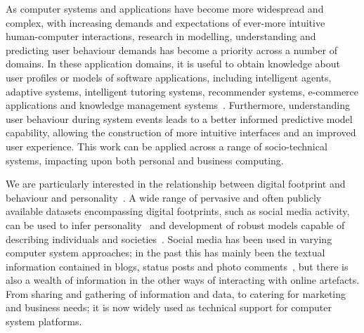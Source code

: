 \documentclass[graybox]{svmult}
\begin{document}
As computer systems and applications have become more widespread and
complex, with increasing demands and expectations of ever-more
intuitive human-computer interactions, research in modelling,
understanding and predicting user behaviour demands has become a
priority across a number of domains.  In these application domains, it
is useful to obtain knowledge about user profiles or models of
software applications, including intelligent agents, adaptive systems,
intelligent tutoring systems, recommender systems, e-commerce
applications and knowledge management
systems~\cite{schiaffino+amandi:2009}. Furthermore, understanding user
behaviour during system events leads to a better informed predictive
model capability, allowing the construction of more intuitive
interfaces and an improved user experience. This work can be applied
across a range of socio-technical systems, impacting upon both
personal and business computing.

We are particularly interested in the relationship between digital
footprint and behaviour and
personality~\cite{oatley+crick:2014,oatley-et-al_dasc2015}. A wide
range of pervasive and often publicly available datasets encompassing
digital footprints, such as social media activity, can be used to
infer
personality~\cite{lambiotte+kosinski:2014,oatley-et-al-soccogcomp2015}
and development of robust models capable of describing individuals and
societies~\cite{lazer-et-al:2009}. Social media has been used in
varying computer system approaches; in the past this has mainly been
the textual information contained in blogs, status posts and photo
comments~\cite{blamey-et-al-2012,blamey-et-al-2013}, but there is also
a wealth of information in the other ways of interacting with online
artefacts. From sharing and gathering of information and data, to
catering for marketing and business needs; it is now widely used as
technical support for computer system platforms.
\end{document}
